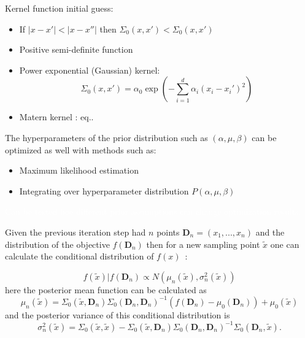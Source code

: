 \documentclass{article}
\newcommand{\todo}[1]{\colorbox{WildStrawberry}{\textcolor{white}{#1}}}
\begin{document}
    Kernel function initial guess:
    \begin{itemize}
        \item If $|x-x'|<|x-x''|$ then $\Sigma_0(x, x')<\Sigma_0(x, x')$
        \item Positive semi-definite function

        \item Power exponential (Gaussian) kernel:
        \begin{equation*}
            \Sigma_0(x, x') = \alpha_0 \exp (-\sum_{i=1}^d \alpha_i (x_i-x_i')^2)
        \end{equation*}
        \item Matern kernel : eq..
    \end{itemize}

    The hyperparameters of the prior distribution such as $(\alpha, \mu, \beta)$ can be optimized as well with methods such as:
    \begin{itemize}
        \item Maximum likelihood estimation
        \item Integrating over hyperparameter distribution $P(\alpha, \mu, \beta)$
    \end{itemize}
    \todo{Can be tested hoe different prior assumptions can change optimization results.}

Given the previous iteration step had $n$ points $\mathbf{D}_n = (x_1, ..., x_n)$ and the distribution of the objective $f(\mathbf{D}_n)$ then for a new sampling point $\tilde x$ one can calculate the conditional distribution of $f(x)$~\cite{rasmussen_gaussian_2006}:

\begin{equation}
    f(\tilde x)|f(\mathbf{D}_n) \propto N(\mu_n(\tilde x), \sigma_n^2(\tilde x))
    \label{eq:cond_distrib_posterior}
\end{equation}
here the posterior mean function can be calculated as 
\begin{equation}
    \mu_n (\tilde x) = \Sigma_0 (\tilde x, \mathbf{D}_n) \Sigma_0 (\mathbf{D}_n, \mathbf{D}_n)^{-1} (f(\mathbf{D}_n)-\mu_0 (\mathbf{D}_n)) + \mu_0 (\tilde x)
    \label{eq:mean_posterior}
\end{equation}
and the posterior variance of this conditional distribution is
\begin{equation}
    \sigma^2_n (\tilde x) = \Sigma_0 (\tilde x, \tilde x) - \Sigma_0 (\tilde x, \mathbf{D}_n) \Sigma_0 (\mathbf{D}_n, \mathbf{D}_n)^{-1} \Sigma_0 (\mathbf{D}_n, \tilde x).
    \label{eq:variance_posterior}
\end{equation}
\end{document}
